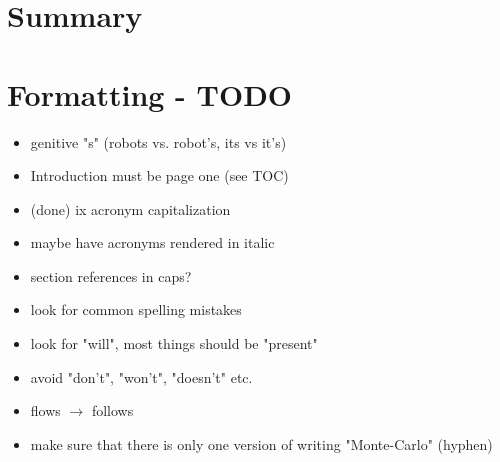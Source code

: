 \chapter{Summary}

\chapter{Formatting - TODO}

\begin{itemize}
  \item genitive "s" (robots vs. robot's, its vs it's)
  \item Introduction must be page one (see TOC)
  \item (done) ix acronym capitalization
  \item maybe have acronyms rendered in italic
  \item section references in caps?
  \item look for common spelling mistakes
  \item look for "will", most things should be "present"
  \item avoid "don't", "won't", "doesn't" etc.\
  \item flows $\to$ follows
  \item make sure that there is only one version of writing "Monte-Carlo" (hyphen)
\end{itemize}
